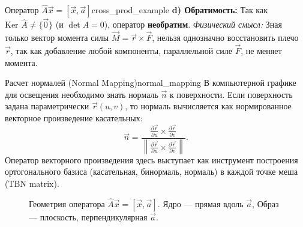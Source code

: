 \documentclass[12pt,a4paper]{article}
\begin{document}
\begin{definition}{Оператор $\hat{A}\vec{x} = [\vec{x},
    \vec{a}]$}{cross_prod_example}
\textbf{d) Обратимость:}
Так как $\text{Ker } \hat{A} \neq \{\vec{0}\}$ (и $\det A = 0$),
оператор \textbf{необратим}.
\textit{Физический смысл:} Зная только вектор момента силы $\vec{M} =
\vec{r} \times \vec{F}$, нельзя однозначно восстановить плечо
$\vec{r}$, так как добавление любой компоненты, параллельной силе
$\vec{F}$, не меняет момента.
\end{definition}

\begin{remarkIT}{Расчет нормалей (Normal Mapping)}{normal_mapping}
В компьютерной графике для освещения необходимо знать нормаль
$\vec{n}$ к поверхности. Если поверхность задана параметрически
$\vec{r}(u,v)$, то нормаль вычисляется как нормированное векторное
произведение касательных:
\[
\vec{n} = \frac{\frac{\partial \vec{r}}{\partial u} \times
\frac{\partial \vec{r}}{\partial v}}{\left\| \frac{\partial
\vec{r}}{\partial u} \times \frac{\partial \vec{r}}{\partial v} \right\|}.
\]
Оператор векторного произведения здесь выступает как инструмент
построения ортогонального базиса (касательная, бинормаль, нормаль) в
каждой точке меша (TBN matrix).
\end{remarkIT}

\begin{figure}[h!]
\centering
{}
\caption{Геометрия оператора $\hat{A}\vec{x} = [\vec{x}, \vec{a}]$.
Ядро — прямая вдоль $\vec{a}$, Образ — плоскость, перпендикулярная $\vec{a}$.}
\label{fig:cross_product_operator}
\end{figure}
\end{document}

